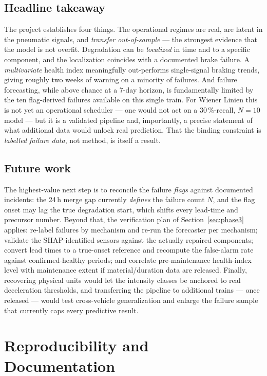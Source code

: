 \documentclass[11pt,a4paper]{article}
\begin{document}
\subsection{Headline takeaway}
The project establishes four things. The operational regimes are real, are latent in the
pneumatic signals, and \emph{transfer out-of-sample} --- the strongest evidence that the
model is not overfit. Degradation can be \emph{localized} in time and to a specific
component, and the localization coincides with a documented brake failure. A
\emph{multivariate} health index meaningfully out-performs single-signal braking trends,
giving roughly two weeks of warning on a minority of failures. And failure forecasting,
while above chance at a 7-day horizon, is fundamentally limited by the ten flag-derived
failures available on this single train. For Wiener Linien this is not yet an operational
scheduler --- one would not act on a 30\,\%-recall, $N=10$ model --- but it is a validated
pipeline and, importantly, a precise statement of what additional data would unlock real
prediction. That the binding constraint is \emph{labelled failure data}, not method, is
itself a result.

\subsection{Future work}
The highest-value next step is to reconcile the failure \emph{flags} against documented
incidents: the 24\,h merge gap currently \emph{defines} the failure count $N$, and the flag
onset may lag the true degradation start, which shifts every lead-time and precursor number.
Beyond that, the verification plan of Section~\ref{sec:phase3} applies: re-label failures by
mechanism and re-run the forecaster per mechanism; validate the SHAP-identified sensors
against the actually repaired components; convert lead times to a true-onset reference and
recompute the false-alarm rate against confirmed-healthy periods; and correlate
pre-maintenance health-index level with maintenance extent if material/duration data are
released. Finally, recovering physical units would let the intensity classes be anchored to
real deceleration thresholds, and transferring the pipeline to additional trains --- once
released --- would test cross-vehicle generalization and enlarge the failure sample that
currently caps every predictive result.

\setcounter{section}{10}
\section{Reproducibility and Documentation}
\label{sec:repro}
\end{document}
